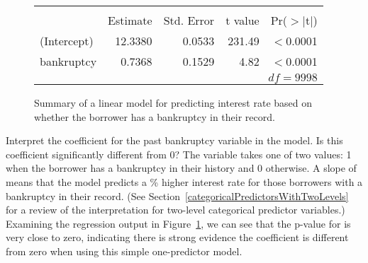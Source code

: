 \begin{figure}[h]
\centering
\begin{tabular}{l rrr r}
  \hline
  \vspace{-3.7mm} & & & & \\
  & Estimate & Std. Error & t value & Pr($>$$|$t$|$) \\ 
  \hline
  (Intercept) & 12.3380 & 0.0533 & 231.49 & $<$0.0001 \\ 
  bankruptcy & 0.7368 & 0.1529 & 4.82 & $<$0.0001 \\ 
  \hline
  &&&\multicolumn{2}{r}{$df=9998$}
\end{tabular}
\caption{Summary of a linear model for predicting
    interest rate based on whether the borrower has
    a bankruptcy in their record.}
\label{intRateVsPastBankrModel}
\end{figure}



\begin{examplewrap}
\begin{nexample}{Interpret the coefficient for the
     past bankruptcy variable in the model.
     Is this coefficient significantly different from 0?}
  The  variable takes one of two values:
  1 when the borrower has a bankruptcy
  in their history and 0 otherwise.
  A slope of \pastbankrACoef{} means that the model predicts a
  \pastbankrACoef{}\% higher
  interest rate for those borrowers with a bankruptcy in
  their record.
  (See Section~\ref{categoricalPredictorsWithTwoLevels}
  for a review of the interpretation for two-level
  categorical predictor variables.)
  Examining the regression output in
  Figure~\ref{intRateVsPastBankrModel},
  we can see that the p-value for 
  is very close to zero, indicating there is strong evidence
  the coefficient is different from zero when using this
  simple one-predictor model.
\end{nexample}
\end{examplewrap}

